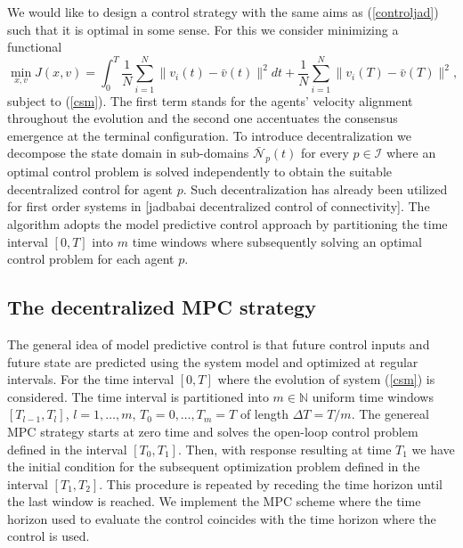 \documentclass[a4paper,10pt, english]{article}
\begin{document}
We would like to design a control strategy with the same aims as (\ref{controljad}) such that it is optimal in some sense. For this we consider minimizing a functional 
 \begin{equation}
 \min_{x, v} J(x, v) = \int_{0}^{T}\frac{1}{N}\sum_{i=1}^{N}\|v_i(t) - \bar{v}(t)\|^2 dt + \frac{1}{N}\sum_{i=1}^{N}\|v_i(T) - \bar{v}(T)\|^2,
\label{j}
\end{equation}
subject to (\ref{csm}). The first term stands for the agents' velocity alignment throughout the evolution and the second one accentuates the consensus emergence at the terminal configuration. 
To introduce decentralization we decompose the state domain in sub-domains $\bar{\mathcal{N}}_p(t)$ for every $p\in \mathcal{I}$ where an optimal control problem is solved independently to obtain the suitable decentralized control for agent $p$. Such decentralization has already been utilized for first order systems in [jadbabai decentralized control of connectivity].
The algorithm adopts the model predictive control approach by partitioning the time interval $[0, T]$ into $m$ time windows where subsequently solving an optimal control problem for each agent $p$.





 \subsection{The decentralized MPC strategy}
 
 The general idea of model predictive control is that future control inputs and future state are predicted using the system model and optimized at regular intervals. For
 the time interval $[0, T]$ where the evolution of system (\ref{csm}) is considered. 
 The time interval is partitioned into $m\in \mathbb{N}$ uniform time windows $[T_{l-1}, T_{l}]$, $l = 1, \dots, m$, $T_0 = 0, \dots, T_m = T$  of length  $\Delta T = T/m$. The genereal MPC strategy starts at zero time and solves the open-loop control problem defined in the interval $[T_0, T_1]$. Then, with response  resulting at time $T_1$ we have the initial condition for the subsequent optimization problem defined in the interval $[T_1, T_2]$. This procedure is repeated by receding the time horizon until the last window is reached. We implement the MPC scheme where the time horizon used to evaluate the control coincides with the time horizon where the control is used.
 
\end{document}
